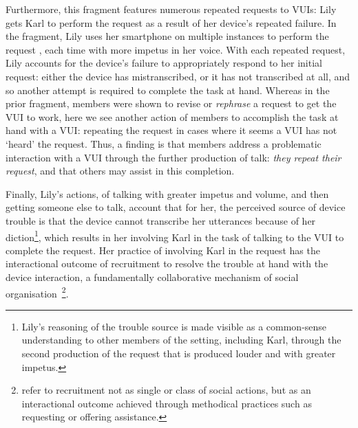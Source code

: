 \begin{revisedsubmission}
Furthermore, this fragment features numerous repeated requests to \acp{VUI}: Lily gets Karl to perform the request as a result of her device's repeated failure.
In the fragment, Lily uses her smartphone on multiple instances to perform the request , each time with more impetus in her voice.
With each repeated request, Lily accounts for the device's failure to appropriately respond to her initial request: either the device has mistranscribed, or it has not transcribed at all, and so another attempt is required to complete the task at hand.
Whereas in the prior fragment, members were shown to revise or \textit{rephrase} a request to get the \ac{VUI} to work, here we see another action of members to accomplish the task at hand with a \ac{VUI}: repeating the request in cases where it seems a \ac{VUI} has not `heard' the request.
Thus, a finding is that members address a problematic interaction with a \ac{VUI} through the further production of talk: \textit{they repeat their request}, and that others may assist in this completion.


Finally, Lily's actions, of talking with greater impetus and volume, and then getting someone else to talk, account that for her, the perceived source of device trouble is that the device cannot transcribe her utterances because of her diction\footnote{Lily's reasoning of the trouble source is made visible as a common-sense understanding to other members of the setting, including Karl, through the second production of the request that is  produced louder and with greater impetus.}, which results in her involving Karl in the task of talking to the \ac{VUI} to complete the request.
Her practice of involving Karl in the request has the interactional outcome of recruitment to resolve the trouble at hand with the device interaction, a fundamentally collaborative mechanism of social organisation~\citep{Kendrick2016}\footnote{\citet{Kendrick2016} refer to recruitment not as single or class of social actions, but as an interactional outcome achieved through methodical practices such as requesting or offering assistance.}.
\end{revisedsubmission}
